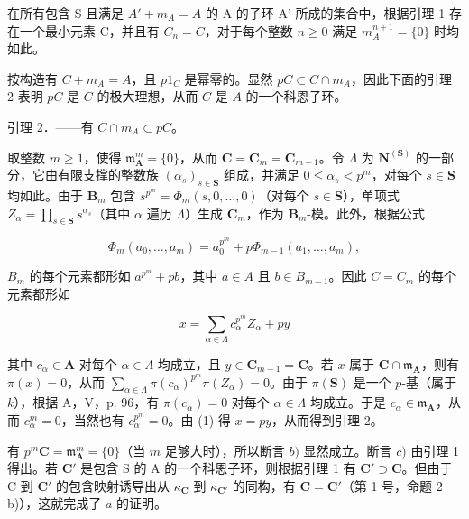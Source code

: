 在所有包含 S 且满足 \(A' + m_{A} = A\) 的 A 的子环 A' 所成的集合中，根据引理 1 存在一个最小元素 C，并且有 \(C_{n} = C\)，对于每个整数 \(n \geqslant 0\) 满足 \(m_{A}^{n+1} = \{0\}\) 时均如此。

按构造有 \(C + m_A = A\)，且 \(p1_C\) 是幂零的。显然 \(pC \subset C \cap m_A\)，因此下面的引理 2 表明 \(pC\) 是 \(C\) 的极大理想，从而 \(C\) 是 \(A\) 的一个科恩子环。

引理 2．——有 \(C \cap m_{A} \subset pC\)。

取整数 \(m \geqslant 1\)，使得 \(\mathfrak{m}_{\mathbf{A}}^{m} = \{0\}\)，从而 \(\mathbf{C} = \mathbf{C}_{m} = \mathbf{C}_{m-1}\)。令 \(\Lambda\) 为 \(\mathbf{N}^{(\mathbf{S})}\) 的一部分，它由有限支撑的整数族 \((\alpha_{s})_{s \in \mathbf{S}}\) 组成，并满足 \(0 \leqslant \alpha_{s} < p^{m}\)，对每个 \(s \in \mathbf{S}\) 均如此。由于 \(\mathbf{B}_{m}\) 包含 \(s^{p^{m}} = \Phi_{m}(s, 0, ..., 0)\)（对每个 \(s \in \mathbf{S}\)），单项式 \(Z_{\alpha} = \prod_{s \in \mathbf{S}} s^{\alpha_{s}}\)（其中 \(\alpha\) 遍历 \(\Lambda\)）生成 \(\mathbf{C}_{m}\)，作为 \(\mathbf{B}_{m}\)-模。此外，根据公式

\[
\Phi_ {m} (a _ {0}, \dots , a _ {m}) = a _ {0} ^ {p ^ {m}} + p \Phi_ {m - 1} (a _ {1}, \dots , a _ {m}),
\]

 \(B_{m}\) 的每个元素都形如 \(a^{p^{m}} + pb\)，其中 \(a \in A\) 且 \(b \in B_{m-1}\)。因此 \(C = C_{m}\) 的每个元素都形如

\[
x = \sum_ {\alpha \in \Lambda} c _ {\alpha} ^ {p ^ {m}} Z _ {\alpha} + p y\tag{1}
\]

其中 \(c_{\alpha} \in \mathbf{A}\) 对每个 \(\alpha \in \Lambda\) 均成立，且 \(y \in \mathbf{C}_{m-1} = \mathbf{C}\)。若 \(x\) 属于 \(\mathbf{C} \cap \mathfrak{m}_{\mathbf{A}}\)，则有 \(\pi(x) = 0\)，从而 \(\sum_{\alpha \in \Lambda} \pi(c_{\alpha})^{p^m} \pi(Z_{\alpha}) = 0\)。由于 \(\pi(\mathbf{S})\) 是一个 \(p\)-基（属于 \(k\)），根据 A，V，p. 96，有 \(\pi(c_{\alpha}) = 0\) 对每个 \(\alpha \in \Lambda\) 均成立。于是 \(c_{\alpha} \in \mathfrak{m}_{\mathbf{A}}\)，从而 \(c_{\alpha}^m = 0\)，当然也有 \(c_{\alpha}^{p^m} = 0\)。由 (1) 得 \(x = py\)，从而得到引理 2。

有 \(p^m\mathbf{C} = \mathfrak{m}_{\mathbf{A}}^m = \{0\}\)（当 \(m\) 足够大时），所以断言 \(b)\) 显然成立。断言 \(c)\) 由引理 1 得出。若 \(\mathbf{C}'\) 是包含 S 的 A 的一个科恩子环，则根据引理 1 有 \(\mathbf{C}' \supset \mathbf{C}\)。但由于 C 到 \(\mathbf{C}'\) 的包含映射诱导出从 \(\kappa_{\mathbf{C}}\) 到 \(\kappa_{\mathbf{C}'}\) 的同构，有 \(\mathbf{C} = \mathbf{C}'\)（第 1 号，命题 2 b)），这就完成了 \(a\) 的证明。

